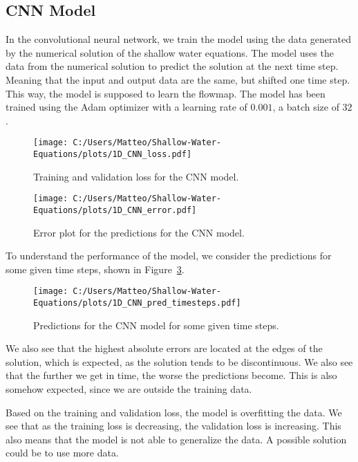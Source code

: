 \subsection*{CNN Model}
In the convolutional neural network, we train the model using the data generated by the numerical solution of the shallow water equations.
The model uses the data from the numerical solution to predict the solution at the next time step.
Meaning that the input and output data are the same, but shifted one time step.
This way, the model is supposed to learn the flowmap.
The model has been trained using the Adam optimizer with a learning rate of $0.001$, a batch size of $32$.

\begin{figure}[H]
    \centering
    \texttt{[image: C:/Users/Matteo/Shallow-Water-Equations/plots/1D\_CNN\_loss.pdf]}
    \caption{Training and validation loss for the CNN model.}\label{fig:1D_CNN_loss}
\end{figure}


\begin{figure}[H]
    \centering
    \texttt{[image: C:/Users/Matteo/Shallow-Water-Equations/plots/1D\_CNN\_error.pdf]}
    \caption{Error plot for the predictions for the CNN model.}\label{fig:1D_CNN_error}
\end{figure}

To understand the performance of the model, we consider the predictions for some given time steps, shown in Figure~\ref{fig:1D_CNN_pred_timesteps}.

\begin{figure}[H]
    \centering
    \texttt{[image: C:/Users/Matteo/Shallow-Water-Equations/plots/1D\_CNN\_pred\_timesteps.pdf]}
    \caption{Predictions for the CNN model for some given time steps.}\label{fig:1D_CNN_pred_timesteps}
\end{figure}

We also see that the highest absolute errors are located at the edges of the solution, which is expected, as the solution tends to be discontinuous.
We also see that the further we get in time, the worse the predictions become. This is also somehow expected, since we are outside the training data.

Based on the training and validation loss, the model is overfitting the data. We see that as the training loss is decreasing, the validation loss is increasing.
This also means that the model is not able to generalize the data.
A possible solution could be to use more data.

